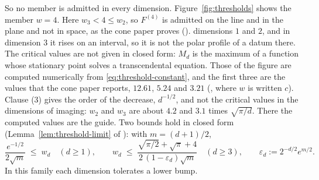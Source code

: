 So no member is admitted in every dimension. Figure~\ref{fig:thresholds} shows the member
$w = 4$. Here
$w_3 < 4 \le w_2$, so $F^{(4)}$ is admitted on the line and in the plane and not in space, as
the cone paper proves ().
dimensions $1$ and $2$, and in dimension $3$ it rises on an interval, so it is not the polar
profile of a datum there. The critical values are not given in closed form: $M_d$ is the
maximum of a function whose stationary point solves a transcendental equation. Those of the
figure are computed numerically from \ref{eq:threshold-constant}, and the first three are the
values that the cone paper reports, $12.61$, $5.24$ and $3.21$ (, where $w$
is written $c$). Clause (3) gives the order of the decrease, $d^{-1/2}$, and not the
critical values in the dimensions of imaging: $w_2$ and $w_3$ are about $4.2$ and $3.1$ times
$\sqrt{\pi/d}$. There the computed values are the guide.
Two bounds hold in closed form (Lemma~\ref{lem:threshold-limit} of \suppl): with $m = (d+1)/2$,
\[
  \frac{e^{-1/2}}{2\sqrt m} \;\le\; w_d \quad (d \ge 1), \qquad
  w_d \;\le\; \frac{\sqrt{\pi/2} + \sqrt\pi + 4}{2\,(1 - \varepsilon_d)\sqrt m} \quad (d \ge 3),
  \qquad \varepsilon_d := 2^{-d/2}e^{m/2} .
\]
In this family each dimension tolerates a lower bump.

